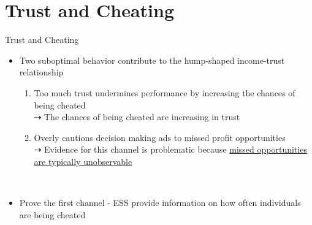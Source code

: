 \documentclass[pdftex,12pt,xcolor=pdftex,table]{beamer}
\begin{document}
\section{Trust and Cheating}
\begin{frame}{Trust and Cheating}
    \begin{itemize}
        \item Two suboptimal behavior contribute to the hump-shaped income-trust relationship
        \begin{enumerate}
            \item Too much trust undermines performance by increasing the chances of being cheated
            \\ $\dashrightarrow$ The chances of being cheated are increasing in trust \pause
            \item Overly cautions decision making ads to missed profit opportunities
            \\ $\dashrightarrow$ Evidence for this channel is problematic because \underline{missed opportunities are typically unobservable}
        \end{enumerate} \\
    \item Prove the first channel - ESS provide information on how often individuals are being cheated
    \end{itemize}
\end{frame}
\end{document}
